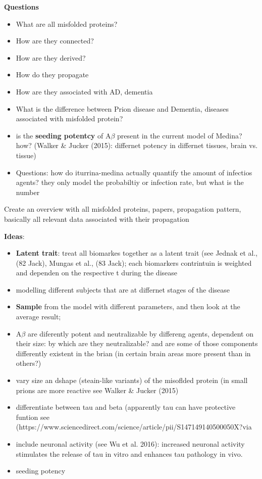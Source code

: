 \documentclass[fleqn]{article}\usepackage{caption}
\begin{document}
\textbf{Questions}
\begin{itemize}
\item What are all misfolded proteins?
\item How are they connected?
\item How are they derived?
\item How do they propagate
\item How are they associated with AD, dementia
\item What is the difference between Prion disease and Dementia, diseases associated with misfolded protein?
\item is the \textbf{seeding potentcy} of A$\beta$ present in the current model of Medina? how? (Walker \& Jucker (2015): differnet potency in differnet tissues, brain vs. tissue)
\item Questions: how do iturrina-medina actually quantify the amount of infectios agents? they only model the probabiltiy or infection rate, but what is the number
\end{itemize}



Create an overview with all misfolded proteins, papers, propagation pattern, basically all relevant data associated with their propagation



%
%
\textbf{Ideas}: 
\begin{itemize}
\item \textbf{Latent trait}: treat all biomarkes together as a latent trait (see Jednak et al., (82 Jack), Mungas et al., (83 Jack); each biomarkers contrintuin is weighted and dependen on the respective  t during the disease 
\item modelling different subjects that are at differnet stages of the disease
\item \textbf{Sample} from the model with different parameters, and then look at the average result;
\item A$\beta$ are diferently potent and neutralizable by differeng agents, dependent on their size: by which are they neutralizable? and are some of those components differently existent in the brian (in certain brain areas more present than in others?)
\item vary size an dshape (steain-like variants) of the misoflded protein (in small prions are more reactive see Walker \& Jucker (2015) %
\item differentiate between tau and beta (apparently tau can have protective funtion see (https://www.sciencedirect.com/science/article/pii/S147149140500050X?via%
\item include neuronal activity (see Wu et al. 2016): increased neuronal activity stimulates the release of tau in vitro and enhances tau pathology in vivo. 
\item seeding potency
\end{itemize}
\end{document}
